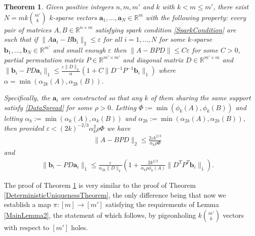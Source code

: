 \documentclass[journal, onecolumn]{IEEEtran}
\newtheorem{theorem}{Theorem}
\begin{document}
\begin{theorem}\label{DeterministicUniquenessTheorem2}
Given positive integers $n, m, m'$ and $k$ with $k < m \leq m'$, there exist $N =  mk{m' \choose k}$ $k$-sparse vectors $\mathbf{a}_1, \ldots, \mathbf{a}_N \in \mathbb{R}^m$ with the following property: every pair of matrices $A, B \in \mathbb{R}^{n \times m}$ satisfying spark condition \eqref{SparkCondition} are such that if $\| A\mathbf{a}_i - B\mathbf{b}_i \|_2 \leq \varepsilon$ for all $i = 1, \ldots, N$ for some $k$-sparse $\mathbf{b}_1, \ldots, \mathbf{b}_N \in \mathbb{R}^{m'}$ and small enough $\varepsilon$ then $\|A - BPD\| \leq C\varepsilon$ for some $C > 0$, partial permutation matrix $P \in \mathbb{R}^{m' \times m'}$ and diagonal matrix $D \in \mathbb{R}^{m' \times m}$ and $\|\mathbf{b}_i - PD\mathbf{a}_i\|_1 \leq \frac{\varepsilon \|D\|_2}{\alpha}\left( 1 + C\|D^{-1}P^{-1}\mathbf{b}_i\|_1 \right)$ where $\alpha = \min( \alpha_{2k}(A), \alpha_{2k}(B))$.


Specifically, the $\mathbf{a}_i$ are constructed so that any $k$ of them sharing the same support satisfy \eqref{DataSpread} for some $\rho > 0$. Letting $\Phi := \min(\phi_k(A), \phi_k(B))$ and letting $\alpha_k := \min( \alpha_k(A), \alpha_k(B) )$ and $\alpha_{2k} := \min( \alpha_{2k}(A), \alpha_{2k}(B) )$, then provided $\varepsilon < (2k)^{-2/3}\alpha_k^2\rho \Phi$ we have
\begin{align}
\|A - BPD\|_2 \leq \frac{2\varepsilon k^{2/3} }{\alpha_k\rho \Phi}
\end{align}
%
and 
\begin{align}\label{b_PDa}
\|\mathbf{b}_i - PD\mathbf{a}_i\|_1 \leq \frac{\varepsilon}{\alpha_{2k}\|D\|_2}  \left( 1 + \frac{2 k^{2/3}}{\alpha_k\rho \phi_k(A)}\|D^TP^T\mathbf{b}_i\|_1 \right).
\end{align}
\end{theorem}

The proof of Theorem \ref{DeterministicUniquenessTheorem2} is very similar to the proof of Theorem \ref{DeterministicUniquenessTheorem}, the only difference being that now we establish a map $\pi: [m] \to [m']$ satisfying the requirements of Lemma \ref{MainLemma2}, the statement of which follows, by pigeonholing $k{m' \choose k}$ vectors with respect to $[m']$ holes.
\end{document}
